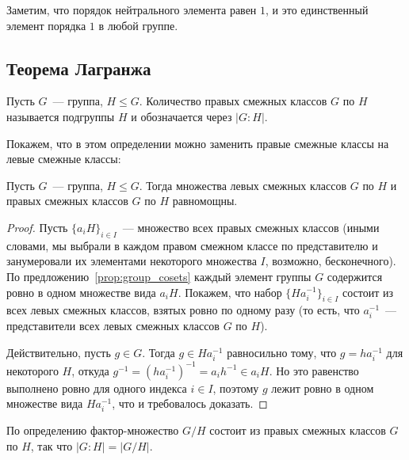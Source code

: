 \begin{remark}\label{rem:order_of_neutral_element}
Заметим, что порядок нейтрального элемента равен $1$, и это
единственный элемент порядка $1$ в любой группе.
\end{remark}


\subsection{Теорема Лагранжа}


\begin{definition}
Пусть $G$~--- группа, $H\leq G$. Количество правых смежных классов $G$
по $H$ называется  подгруппы $H$
и обозначается через $|G:H|$.
\end{definition}

Покажем, что в этом определении можно заменить правые смежные классы
на левые смежные классы:

\begin{lemma}
Пусть $G$~--- группа, $H\leq G$. Тогда множества левых смежных классов
$G$ по $H$ и правых смежных классов $G$ по $H$ равномощны.
\end{lemma}
\begin{proof}
Пусть $\{a_iH\}_{i\in I}$~--- множество всех правых смежных классов
(иными словами, мы выбрали в каждом правом смежном классе по
представителю и занумеровали их элементами некоторого множества $I$,
возможно, бесконечного). 
По предложению~\ref{prop:group_cosets} каждый элемент группы $G$
содержится ровно в одном множестве вида $a_iH$. Покажем, что
набор $\{Ha_i^{-1}\}_{i\in I}$ состоит из всех левых смежных классов,
взятых ровно по одному разу (то есть, что $a_i^{-1}$~--- представители
всех левых смежных классов $G$ по $H$).

Действительно, пусть $g\in G$. Тогда $g\in Ha_i^{-1}$ равносильно тому, что
$g=ha_i^{-1}$ для некоторого $H$, откуда $g^{-1} = (ha_i^{-1})^{-1} =
a_ih^{-1}\in a_iH$. Но это равенство выполнено ровно для одного
индекса $i\in I$, поэтому $g$ лежит ровно в одном множестве вида
$Ha_i^{-1}$, что и требовалось доказать.
\end{proof}

\begin{remark}
По определению фактор-множество $G/H$ состоит из правых смежных
классов $G$ по $H$, так что $|G:H| = |G/H|$.
\end{remark}

